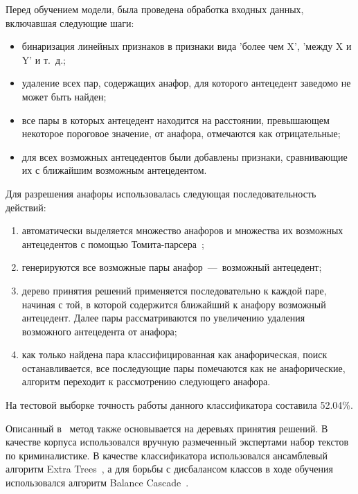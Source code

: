 Перед обучением модели, была проведена обработка входных данных, включавшая следующие шаги:
\begin{itemize}
	\item бинаризация линейных признаков в признаки вида 'более чем X', 'между X и Y' и т.~д.;
	\item удаление всех пар, содержащих анафор, для которого антецедент заведомо не может быть найден;
	\item все пары в которых антецедент находится на расстоянии, превышающем некоторое пороговое значение, от анафора, отмечаются как отрицательные;
	\item  для всех возможных антецедентов были добавлены признаки, сравнивающие их с ближайшим возможным антецедентом.
\end{itemize}

Для разрешения анафоры использовалась следующая последовательность действий:
\begin{enumerate}
	\item автоматически выделяется множество анафоров и множества их возможных антецедентов с помощью Томита-парсера~\cite{yandexTomitaDoc};
	\item генерируются все возможные пары анафор~---~возможный антецедент;
	\item дерево принятия решений применяется последовательно к каждой паре, начиная с той, в которой содержится ближайший к анафору возможный антецедент. Далее пары рассматриваются по увеличению удаления возможного антецедента от анафора;
	\item как только найдена пара классифицированная как анафорическая, поиск останавливается, все последующие пары помечаются как не анафорические, алгоритм переходит к рассмотрению следующего анафора.
\end{enumerate}

На тестовой выборке точность работы данного классификатора составила 52.04\%.

Описанный в~\cite{gureenkova2017complex} метод также основывается на деревьях принятия решений. В качестве корпуса использовался вручную размеченный экспертами набор текстов по криминалистике. В качестве классификатора использовался ансамблевый алгоритм Extra Trees~\cite{geurts2006extremely}, а для борьбы с дисбалансом классов в ходе обучения использовался алгоритм Balance Cascade~\cite{rani2022machine}.

